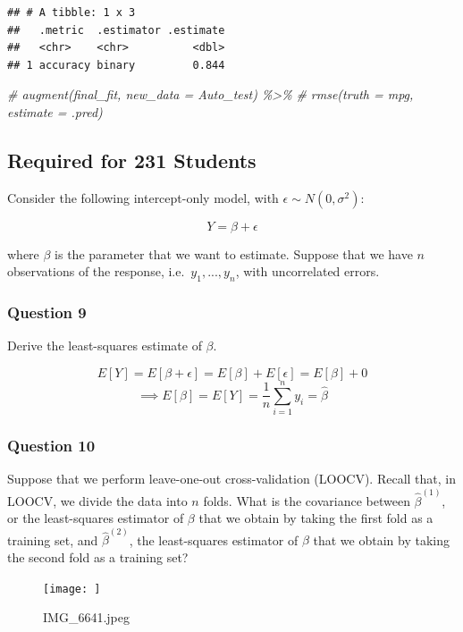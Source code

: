 \documentclass[
]{article}
\newenvironment{Shaded}{\begin{snugshade}}{\end{snugshade}}
\newcommand{\CommentTok}[1]{\textcolor[rgb]{0.56,0.35,0.01}{\textit{#1}}}
\begin{document}
\begin{verbatim}
## # A tibble: 1 x 3
##   .metric  .estimator .estimate
##   <chr>    <chr>          <dbl>
## 1 accuracy binary         0.844
\end{verbatim}

\begin{Shaded}
\begin{Highlighting}[]
\CommentTok{\# augment(final\_fit, new\_data = Auto\_test) \%\textgreater{}\%}
\CommentTok{\#   rmse(truth = mpg, estimate = .pred)}
\end{Highlighting}
\end{Shaded}

\hypertarget{required-for-231-students}{%
\subsection{Required for 231 Students}\label{required-for-231-students}}

Consider the following intercept-only model, with
\(\epsilon \sim N(0, \sigma^2)\):

\[
Y=\beta+\epsilon
\]

where \(\beta\) is the parameter that we want to estimate. Suppose that
we have \(n\) observations of the response, i.e.~\(y_{1}, ..., y_{n}\),
with uncorrelated errors.

\hypertarget{question-9}{%
\subsubsection{Question 9}\label{question-9}}

Derive the least-squares estimate of \(\beta\).

\[E[Y] = E[\beta + \epsilon] = E[\beta] + E[\epsilon] = E[\beta] + 0\]
\[\implies E[\beta] = E[Y] = \frac{1}{n}\sum_{i=1}^n y_i = \hat\beta\]

\hypertarget{question-10}{%
\subsubsection{Question 10}\label{question-10}}

Suppose that we perform leave-one-out cross-validation (LOOCV). Recall
that, in LOOCV, we divide the data into \(n\) folds. What is the
covariance between \(\hat{\beta}^{(1)}\), or the least-squares estimator
of \(\beta\) that we obtain by taking the first fold as a training set,
and \(\hat{\beta}^{(2)}\), the least-squares estimator of \(\beta\) that
we obtain by taking the second fold as a training set?

\begin{figure}
\centering
\texttt{[image: ]}
\caption{IMG\_6641.jpeg}
\end{figure}
\end{document}
